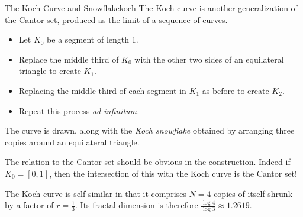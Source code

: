 \begin{example}{The Koch Curve and Snowflake}{koch}
The Koch curve is another generalization of the Cantor set, produced as the limit of a sequence of curves.\par
\begin{minipage}[t]{0.64\linewidth}\vspace{-5pt}
\begin{itemize}\itemsep0pt
  \item Let $K_0$ be a segment of length 1.
  \item Replace the middle third of $K_0$ with the other two sides of an equilateral triangle to create $K_1$.
  \item Replacing the middle third of each segment in $K_1$ as before to create $K_2$.
  \item Repeat this process \emph{ad infinitum.}
\end{itemize}
The curve is drawn, along with the \emph{Koch snowflake} obtained by arranging three copies around an equilateral triangle.\smallbreak

The relation to the Cantor set should be obvious in the construction. Indeed if $K_0=[0,1]$, then the intersection of this with the Koch curve is the Cantor set!\smallbreak

The Koch curve is self-similar in that it comprises $N=4$ copies of itself shrunk by a factor of $r=\frac 13$. Its fractal dimension is therefore $\frac{\log 4}{\log 3}\approx 1.2619$.\smallbreak


\end{minipage}
\end{example}
